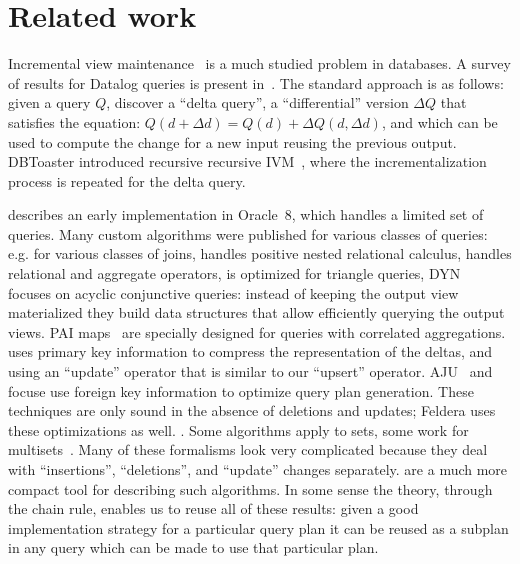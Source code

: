 \section{Related work}\label{sec:related}

Incremental view
maintenance~\cite{buneman-actd79,blakeley-sigmod86,gupta-sigmod93,chaudhuri-icde95,gupta-idb95,chirkova-book12}
is a much studied problem in databases.  A survey of results for
Datalog queries is present in~\cite{motik-ai19}.  The standard
approach is as follows: given a query $Q$, discover a ``delta query'',
a ``differential'' version $\Delta Q$ that satisfies the equation:
$Q(d+\Delta d)=Q(d)+\Delta Q(d,\Delta d)$, and which can be used to
compute the change for a new input reusing the previous output.
DBToaster introduced recursive recursive
IVM~\cite{ahmad-vldb09,koch-pods10}, where the incrementalization
process is repeated for the delta query.

\cite{bello-vldb98} describes an early implementation in Oracle~8,
which handles a limited set of queries.  Many custom algorithms were
published for various classes of queries:
e.g. \cite{griffin-sigmod98,larson-icde07} for various classes of
joins, \cite{koch-pods16} handles positive nested relational calculus,
\cite{gupta-infsys06} handles relational and aggregate operators,
\cite{kara-tds20} is optimized for triangle queries,
DYN~\cite{idris-sigmod17,idris-vldb18,idris-sigmod19} focuses on
acyclic conjunctive queries: instead of keeping the output view
materialized they build data structures that allow efficiently
querying the output views.  PAI maps~\cite{abeysinghe-sigmod22} are
specially designed for queries with correlated aggregations.
\cite{katsis-sigmod15} uses primary key information to compress the
representation of the deltas, and using an ``update'' operator that is
similar to our ``upsert'' operator.  AJU~\cite{wang-sigmod20} and
\cite{svingos-amd23} focuse use foreign key information to optimize
query plan generation.  These techniques are only sound in the absence
of deletions and updates; Feldera uses these optimizations as well.  .
Some algorithms apply to sets, some work for
multisets~\cite{griffin-sigmod95}.  Many of these formalisms look very
complicated because they deal with ``insertions'', ``deletions'', and
``update'' changes separately.  \zrs are a much more compact tool for
describing such algorithms.  In some sense the \dbsp theory, through
the chain rule, enables us to reuse all of these results: given a good
implementation strategy for a particular query plan it can be reused
as a subplan in any query which can be made to use that particular
plan.

